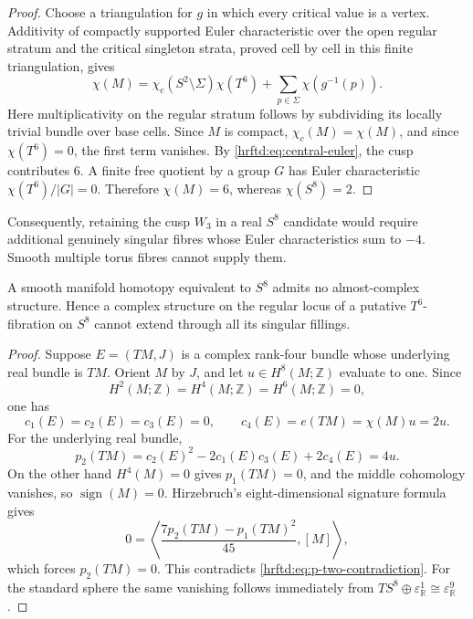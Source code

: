\begin{proof}
Choose a triangulation for \(g\) in which every critical value is a vertex.
Additivity of compactly supported Euler characteristic over the open
regular stratum and the critical singleton strata, proved cell by cell in
this finite triangulation, gives
\[
 \chi(M)
 =
 \chi_c(S^2\setminus\Sigma)\chi(T^6)
 +\sum_{p\in\Sigma}\chi(g^{-1}(p)).
\]
Here multiplicativity on the regular stratum follows by subdividing its
locally trivial bundle over base cells.  Since \(M\) is compact,
\(\chi_c(M)=\chi(M)\), and since \(\chi(T^6)=0\), the first term vanishes.
By \eqref{hrftd:eq:central-euler}, the cusp contributes \(6\).
A finite free quotient by a group \(G\) has Euler characteristic
\(\chi(T^6)/|G|=0\).  Therefore
\(\chi(M)=6\), whereas \(\chi(S^8)=2\).
\end{proof}

Consequently, retaining the cusp \(W_3\) in a real \(S^8\) candidate would
require additional genuinely singular fibres whose Euler characteristics sum
to \(-4\).  Smooth multiple torus fibres cannot supply them.

\begin{theorem}
\label{hrftd:thm:no-almost-complex-s8}
A smooth manifold homotopy equivalent to \(S^8\) admits no almost-complex
structure.  Hence a complex structure on the regular locus of a putative
\(T^6\)-fibration on \(S^8\) cannot extend through all its singular fillings.
\end{theorem}

\begin{proof}
Suppose \(E=(TM,J)\) is a complex rank-four bundle whose underlying real
bundle is \(TM\).  Orient \(M\) by \(J\), and let
\(u\in H^8(M;\mathbb Z)\) evaluate to one.  Since
\[
 H^2(M;\mathbb Z)=H^4(M;\mathbb Z)=H^6(M;\mathbb Z)=0,
\]
one has
\[
 c_1(E)=c_2(E)=c_3(E)=0,\qquad
 c_4(E)=e(TM)=\chi(M)u=2u.
\]
For the underlying real bundle,
\begin{equation}
 p_2(TM)
 =c_2(E)^2-2c_1(E)c_3(E)+2c_4(E)
 =4u.
 \label{hrftd:eq:p-two-contradiction}
\end{equation}
On the other hand \(H^4(M)=0\) gives \(p_1(TM)=0\), and the middle
cohomology vanishes, so \(\operatorname{sign}(M)=0\).  Hirzebruch's
eight-dimensional signature formula gives
\[
 0
 =
 \left\langle
 \frac{7p_2(TM)-p_1(TM)^2}{45},[M]
 \right\rangle,
\]
which forces \(p_2(TM)=0\).  This contradicts
\eqref{hrftd:eq:p-two-contradiction}.  For the standard sphere the same
vanishing follows immediately from
\(TS^8\oplus\varepsilon^1_{\mathbb R}\cong\varepsilon^9_{\mathbb R}\).
\end{proof}

